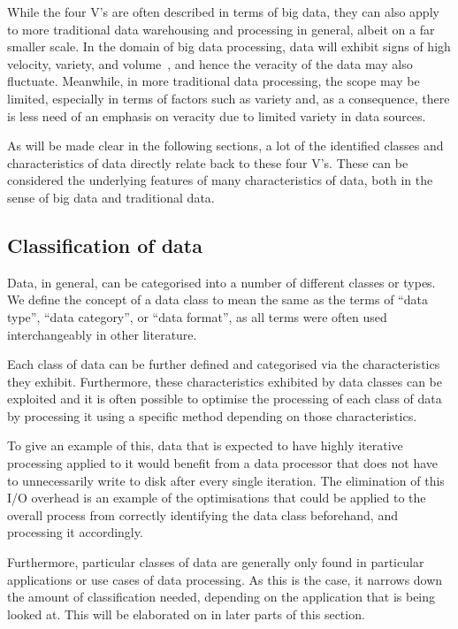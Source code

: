 \documentclass[a4paper,11pt]{article}
\begin{document}
While the four V's are often described in terms of big data, they can also apply to more traditional data warehousing
and processing in general, albeit on a far smaller scale. In the domain of big data processing, data will exhibit signs
of high velocity, variety, and volume~\cite{beyer2011gartner}, and hence the veracity of the data may also fluctuate.
Meanwhile, in more traditional data processing, the scope may be limited, especially in terms of factors such as variety
and, as a consequence, there is less need of an emphasis on veracity due to limited variety in data sources.

As will be made clear in the following sections, a lot of the identified classes and characteristics of data directly
relate back to these four V's. These can be considered the underlying features of many characteristics of data, both in
the sense of big data and traditional data.



\subsection{Classification of data} %
\label{sub:data_classification}

Data, in general, can be categorised into a number of different classes or types. We define the concept of a data class
to mean the same as the terms of ``data type'', ``data category'', or ``data format'', as all terms were often used
interchangeably in other literature.

Each class of data can be further defined and categorised via the characteristics they exhibit. Furthermore, these
characteristics exhibited by data classes can be exploited and it is often possible to optimise the processing of each
class of data by processing it using a specific method depending on those characteristics.

To give an example of this, data that is expected to have highly iterative processing applied to it would benefit from a
data processor that does not have to unnecessarily write to disk after every single iteration. The elimination of this
I/O overhead is an example of the optimisations that could be applied to the overall process from correctly identifying
the data class beforehand, and processing it accordingly.

Furthermore, particular classes of data are generally only found in particular applications or use cases of data
processing. As this is the case, it narrows down the amount of classification needed, depending on the application that
is being looked at. This will be elaborated on in later parts of this section.
\end{document}
